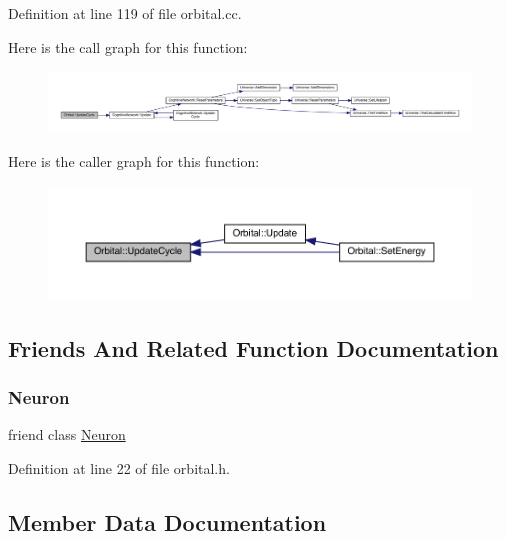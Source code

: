 Definition at line 119 of file orbital.\+cc.

Here is the call graph for this function\+:
\nopagebreak
\begin{figure}[H]
\begin{center}
\leavevmode
\includegraphics[width=350pt]{class_orbital_afbf72ba4e260627422c9f53dea793923_cgraph}
\end{center}
\end{figure}
Here is the caller graph for this function\+:
\nopagebreak
\begin{figure}[H]
\begin{center}
\leavevmode
\includegraphics[width=350pt]{class_orbital_afbf72ba4e260627422c9f53dea793923_icgraph}
\end{center}
\end{figure}


\subsection{Friends And Related Function Documentation}
\mbox{\label{class_orbital_aa410d74ba34b18a9f6bdf24323c4ee5b}} 
\subsubsection{\texorpdfstring{Neuron}{Neuron}}
{\footnotesize\ttfamily friend class \hyperlink{class_neuron}{Neuron}\hspace{0.3cm}{\ttfamily [friend]}}



Definition at line 22 of file orbital.\+h.



\subsection{Member Data Documentation}
\mbox{\label{class_orbital_a504f1b3e8621e7eb7e682c3cec48272d}} 
